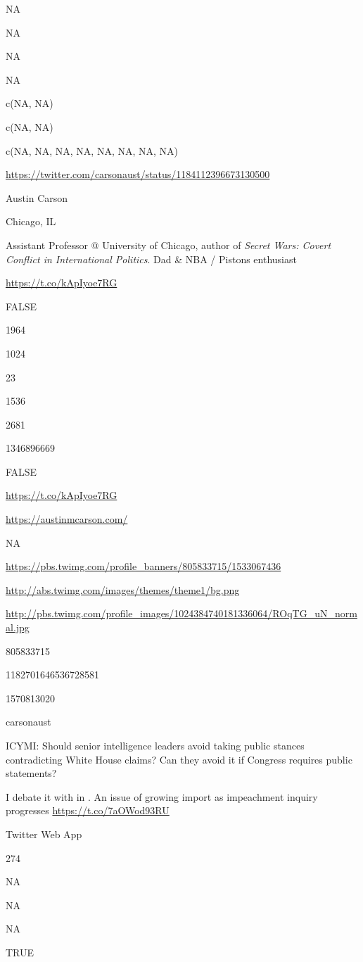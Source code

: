 \documentclass[]{book}
\begin{document}
NA

NA

NA

NA

c(NA, NA)

c(NA, NA)

c(NA, NA, NA, NA, NA, NA, NA, NA)

\url{https://twitter.com/carsonaust/status/1184112396673130500}

Austin Carson

Chicago, IL

Assistant Professor @ University of Chicago, author of \emph{Secret Wars: Covert Conflict in International Politics}. Dad \& NBA / Pistons enthusiast

\url{https://t.co/kApIyoe7RG}

FALSE

1964

1024

23

1536

2681

1346896669

FALSE

\url{https://t.co/kApIyoe7RG}

\url{https://austinmcarson.com/}

NA

\url{https://pbs.twimg.com/profile_banners/805833715/1533067436}

\url{http://abs.twimg.com/images/themes/theme1/bg.png}

\url{http://pbs.twimg.com/profile_images/1024384740181336064/ROqTG_uN_normal.jpg}

805833715

1182701646536728581

1570813020

carsonaust

ICYMI: Should senior intelligence leaders avoid taking public stances contradicting White House claims? Can they avoid it if Congress requires public statements?

I debate it with \citet{JoshRovner1} in \citet{lawfareblog}. An issue of growing import as impeachment inquiry progresses \url{https://t.co/7aOWod93RU}

Twitter Web App

274

NA

NA

NA

TRUE
\end{document}
